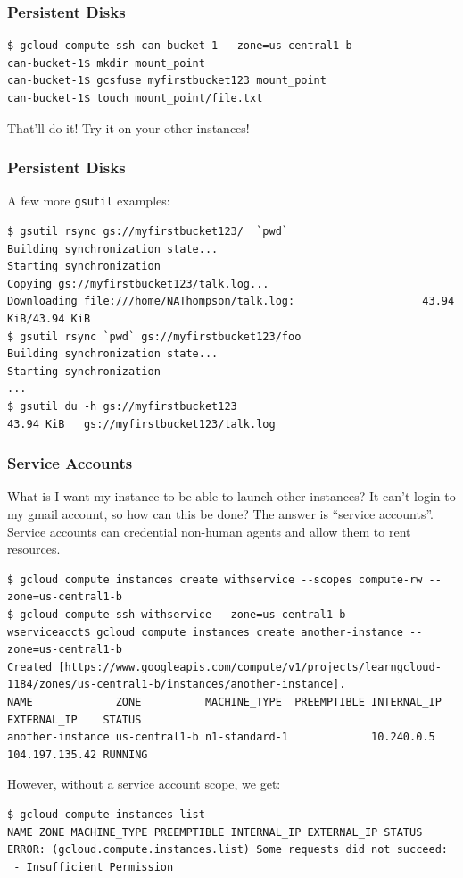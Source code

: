 \documentclass[9pt]{beamer}
\begin{document}
\begin{frame}[fragile]
\frametitle{Persistent Disks}
\begin{verbatim} 
$ gcloud compute ssh can-bucket-1 --zone=us-central1-b
can-bucket-1$ mkdir mount_point
can-bucket-1$ gcsfuse myfirstbucket123 mount_point
can-bucket-1$ touch mount_point/file.txt
\end{verbatim}
That'll do it! Try it on your other instances!
\end{frame}

\begin{frame}[fragile]
  \frametitle{Persistent Disks}
  A few more \texttt{gsutil} examples:
  \begin{verbatim}
$ gsutil rsync gs://myfirstbucket123/  `pwd`
Building synchronization state...
Starting synchronization
Copying gs://myfirstbucket123/talk.log...
Downloading file:///home/NAThompson/talk.log:                    43.94 KiB/43.94 KiB
$ gsutil rsync `pwd` gs://myfirstbucket123/foo
Building synchronization state...
Starting synchronization
...
$ gsutil du -h gs://myfirstbucket123
43.94 KiB   gs://myfirstbucket123/talk.log
  \end{verbatim}
\end{frame}

\begin{frame}[fragile]
\frametitle{Service Accounts}
What is I want my instance to be able to launch other instances? It can't login to my gmail account, so how can this be done? The answer is ``service accounts''. Service accounts can credential non-human agents and allow them to rent resources.
\begin{verbatim}
$ gcloud compute instances create withservice --scopes compute-rw --zone=us-central1-b
$ gcloud compute ssh withservice --zone=us-central1-b
wserviceacct$ gcloud compute instances create another-instance --zone=us-central1-b
Created [https://www.googleapis.com/compute/v1/projects/learngcloud-1184/zones/us-central1-b/instances/another-instance].
NAME             ZONE          MACHINE_TYPE  PREEMPTIBLE INTERNAL_IP EXTERNAL_IP    STATUS
another-instance us-central1-b n1-standard-1             10.240.0.5  104.197.135.42 RUNNING
\end{verbatim}
However, without a service account scope, we get:
\begin{verbatim}
$ gcloud compute instances list
NAME ZONE MACHINE_TYPE PREEMPTIBLE INTERNAL_IP EXTERNAL_IP STATUS
ERROR: (gcloud.compute.instances.list) Some requests did not succeed:
 - Insufficient Permission
\end{verbatim}
\end{frame}
\end{document}
